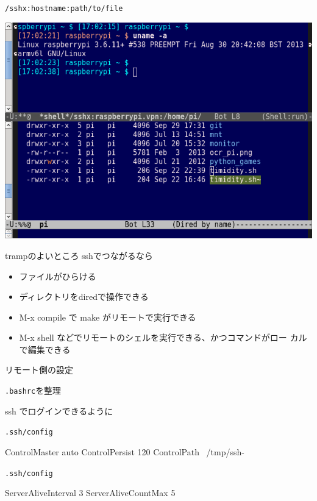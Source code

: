 \begin{frame}{\texttt{/sshx:hostname:path/to/file}}

\includegraphics[width=\hsize]{image201311/tramp-screenshot.png}
 
\end{frame}

\begin{frame}{trampのよいところ}
sshでつながるなら
\begin{itemize}
 \item ファイルがひらける
 \item ディレクトリをdiredで操作できる
 \item M-x compile で make がリモートで実行できる
 \item M-x shell などでリモートのシェルを実行できる、かつコマンドがロー
       カルで編集できる
\end{itemize} 
\end{frame}

\begin{frame}{リモート側の設定}

\texttt{.bashrc}を整理

ssh でログインできるように
 
\end{frame}

\begin{frame}[containsverbatim]{\texttt{.ssh/config}}
\begin{commandline}
 ControlMaster auto
 ControlPersist 120
 ControlPath ~/tmp/ssh-%
\end{commandline}
\end{frame}

\begin{frame}[containsverbatim]{\texttt{.ssh/config}}
\begin{commandline}
 ServerAliveInterval 3
 ServerAliveCountMax 5
\end{commandline}
\end{frame}

